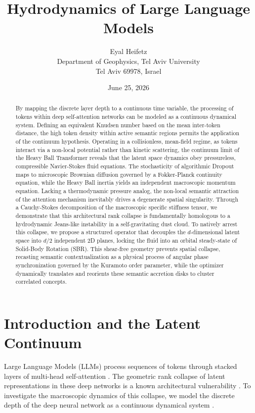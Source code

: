 \documentclass[10pt]{article}
\title{Hydrodynamics of Large Language Models}
\author{Eyal Heifetz\\
Department of Geophysics, Tel Aviv University\\
Tel Aviv 69978, Israel}
\date{June 25, 2026}
\begin{document}
\maketitle

\begin{abstract}
By mapping the discrete layer depth to a continuous time variable, the processing of tokens within deep self-attention networks can be modeled as a continuous dynamical system. Defining an equivalent Knudsen number based on the mean inter-token distance, the high token density within active semantic regions permits the application of the continuum hypothesis. Operating in a collisionless, mean-field regime, as tokens interact via a non-local potential rather than kinetic scattering, the continuum limit of the Heavy Ball Transformer reveals that the latent space dynamics obey pressureless, compressible Navier-Stokes fluid equations. The stochasticity of algorithmic Dropout maps to microscopic Brownian diffusion governed by a Fokker-Planck continuity equation, while the Heavy Ball inertia yields an independent macroscopic momentum equation. Lacking a thermodynamic pressure analog, the non-local semantic attraction of the attention mechanism inevitably drives a degenerate spatial singularity. Through a Cauchy-Stokes decomposition of the macroscopic specific stiffness tensor, we demonstrate that this architectural rank collapse is fundamentally homologous to a hydrodynamic Jeans-like instability in a self-gravitating dust cloud. To natively arrest this collapse, we propose a structured operator that decouples the $d$-dimensional latent space into $d / 2$ independent 2D planes, locking the fluid into an orbital steady-state of Solid-Body Rotation (SBR). This shear-free geometry prevents spatial collapse, recasting semantic contextualization as a physical process of angular phase synchronization governed by the Kuramoto order parameter, while the optimizer dynamically translates and reorients these semantic accretion disks to cluster correlated concepts.
\end{abstract}

\section{Introduction and the Latent Continuum}

Large Language Models (LLMs) process sequences of tokens through stacked layers of multi-head self-attention \cite{ref1}. The geometric rank collapse of latent representations in these deep networks is a known architectural vulnerability \cite{ref2}. To investigate the macroscopic dynamics of this collapse, we model the discrete depth of the deep neural network as a continuous dynamical system \cite{ref3}.
\end{document}
